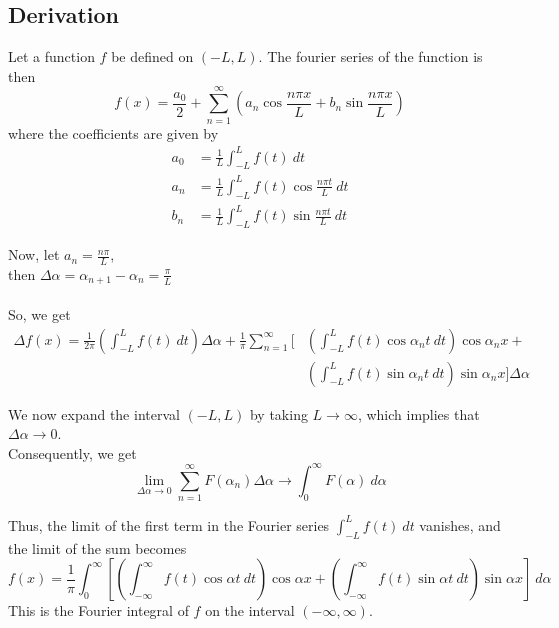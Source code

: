 \documentclass[12pt]{article}
\numberwithin{equation}{subsection}
\begin{document}
\subsection{Derivation}
Let a function $f$ be defined on $(-L,L)$. The fourier series of the function is then
\begin{equation}
    f(x) = \frac{a_0}{2} + \sum_{n=1}^{\infty} \left( a_n \cos{\frac{n\pi x}{L}} + b_n \sin{\frac{n\pi x}{L}} \right)
\end{equation}
where the coefficients are given by
\begin{align*}
    a_0 &= \frac{1}{L} \int_{-L}^{L} {f(t)} \: d{t} \\
    a_n &= \frac{1}{L} \int_{-L}^{L} {f(t) \cos{\frac{n\pi t}{L}}} \: d{t} \\
    b_n &= \frac{1}{L} \int_{-L}^{L} {f(t) \sin{\frac{n\pi t}{L}}} \: d{t}
\end{align*}

Now, let $\displaystyle a_n = \frac{n\pi}{L}$,\\
then $\displaystyle \Delta\alpha=\alpha_{n+1}-\alpha_n=\frac{\pi}{L}$\\~\\

So, we get
\begin{equation}
    \begin{split}
        \Delta{f(x)} = \frac{1}{2\pi} \left( \int_{-L}^{L} {f(t)} \: d{t} \right) \Delta\alpha + \frac{1}{\pi} \sum_{n=1}^{\infty} \Bigg[ &\left( \int_{-L}^{L} {f(t) \cos{\alpha_n}t} \: d{t} \right) \cos{\alpha_n}x + \\
          &\left( \int_{-L}^{L} {f(t) \sin{\alpha_n}t} \: d{t} \right) \sin{\alpha_n}x \Bigg] \Delta\alpha
    \end{split}
\end{equation}

We now expand the interval $(-L,L)$ by taking $L \to \infty$, which implies that $\Delta\alpha \to 0$.\\
Consequently, we get
\begin{equation}
    \lim_{\Delta\alpha \to 0} \sum_{n=1}^{\infty} F(\alpha_n)\Delta\alpha  \to \int_{0}^{\infty} {F(\alpha)} \: d{\alpha} 
\end{equation}

Thus, the limit of the first term in the Fourier series $\displaystyle \int_{-L}^{L} {f(t)} \: d{t}$ vanishes, and the limit of the sum becomes
\begin{equation}
    \boxed{ f(x) = \frac{1}{\pi} \int_{0}^{\infty} { \left[ \left( \int_{-\infty}^{\infty} {f(t) \cos{\alpha t}} \: d{t} \right) \cos{\alpha x} + \left( \int_{-\infty}^{\infty} {f(t) \sin{\alpha t}} \: d{t} \right) \sin{\alpha x} \right] } \: d{\alpha} }
\end{equation}
This is the Fourier integral of $f$ on the interval $(-\infty,\infty)$.
\end{document}
